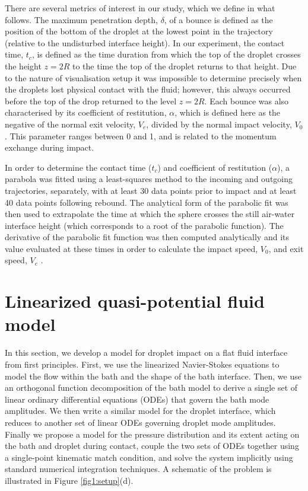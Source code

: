 \documentclass{jfm}
\begin{document}
There are several metrics of interest in our study, which we define in what follows. The maximum penetration depth, $\delta$, of a bounce is defined as the position of the bottom of the droplet at the lowest point in the trajectory (relative to the undisturbed interface height).  In our experiment, the contact time, $t_c$, is defined as the time duration from which the top of the droplet crosses the height $z=2R$ to the time the top of the droplet returns to that height.  Due to the nature of visualisation setup it was impossible to determine precisely when the droplets lost physical contact with the fluid; however, this always occurred before the top of the drop returned to the level $z=2R$.  Each bounce was also characterised by its coefficient of restitution, $\alpha$, which is defined here as the negative of the normal exit velocity, $V_e$, divided by the normal impact velocity, $V_0$. This parameter ranges between 0 and 1, and is related to the momentum exchange during impact.  

In order to determine the contact time ($t_c$) and coefficient of restitution ($\alpha$), a parabola was fitted using a least-squares method to the incoming and outgoing trajectories, separately, with at least 30 data points prior to impact and at least 40 data points following rebound.  The analytical form of the parabolic fit was then used to extrapolate the time at which the sphere crosses the still air-water interface height (which corresponds to a root of the parabolic function).  The derivative of the parabolic fit function was then computed analytically and its value evaluated at these times in order to calculate the impact speed, $V_0$, and exit speed, $V_e$ \citep{galeano2021capillary}.   
\section{Linearized quasi-potential fluid model}
\hspace*{1em} In this section, we develop a model for droplet impact on a flat fluid interface from first principles. First, we use the linearized Navier-Stokes equations to model the flow within the bath and the shape of the bath interface. Then, we use an orthogonal function decomposition of the bath model to derive a single set of linear ordinary differential equations (ODEs) that govern the bath mode amplitudes.  We then write a similar model for the droplet interface, which reduces to another set of linear ODEs governing droplet mode amplitudes.  Finally we propose a model for the pressure distribution and its extent acting on the bath and droplet during contact, couple the two sets of ODEs together using a single-point kinematic match condition, and solve the system implicitly using standard numerical integration techniques.  A schematic of the problem is illustrated in Figure \ref{fig1:setup}(d).
\end{document}
